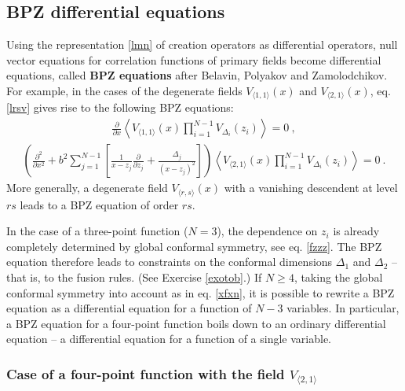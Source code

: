 \documentclass[12pt, a4paper, notitlepage, twoside]{report}
\numberwithin{equation}{section}
\theoremstyle{break}
\begin{document}
\subsection{BPZ differential equations \label{secbpz}}

Using the representation \eqref{lmn} of creation operators as differential operators, null vector equations for correlation functions of primary fields become differential equations, called \textbf{\boldmath BPZ equations} after Belavin, Polyakov and Zamolodchikov. 
For example, in the cases of the degenerate fields $V_{\langle 1,1 \rangle}(x)$ and $V_{\langle 2,1 \rangle}(x)$, eq. \eqref{lrsv} gives rise to the following BPZ equations: 
\begin{align}
 {\frac{\partial}{\partial x}} \left\langle V_{\langle 1,1 \rangle}(x) \prod_{i=1}^{N-1} V_{\Delta_i}(z_i) \right\rangle = 0 \ ,
\label{pvoo} 
\end{align}
\begin{align}
\boxed{\left( \frac{\partial^2}{\partial x^2}  +b^2 \sum_{j=1}^{N-1} \left[\frac{1}{x-z_j}{\frac{\partial}{\partial z_j}}+ \frac{\Delta_j}{(x-z_j)^2} \right]\right)\left\langle V_{\langle 2,1 \rangle}(x) \prod_{i=1}^{N-1} V_{\Delta_i}(z_i) \right\rangle = 0} \ .
\label{pvot}
\end{align}
More generally, a degenerate field $V_{\langle r,s \rangle}(x)$ with a vanishing descendent at level $rs$ leads to a BPZ equation of order $rs$. 

In the case of a three-point function ($N=3$), the dependence on $z_i$ is already completely determined by global conformal symmetry, see eq. \eqref{fzzz}.
The BPZ equation therefore leads to constraints on the conformal dimensions $\Delta_1$ and $\Delta_2$ -- that is, to the fusion rules. (See Exercise \ref{exotob}.) If $N\geq 4$, taking the global conformal symmetry into account as in eq. \eqref{xfxn}, it is possible to rewrite a BPZ equation as a differential equation for a function of $N-3$ variables.
In particular, a BPZ equation for a four-point function boils down to an ordinary differential equation -- a differential equation for a function of a single variable.  

\subsubsection{Case of a four-point function with the field $V_{\langle 2,1 \rangle}$}
\end{document}
